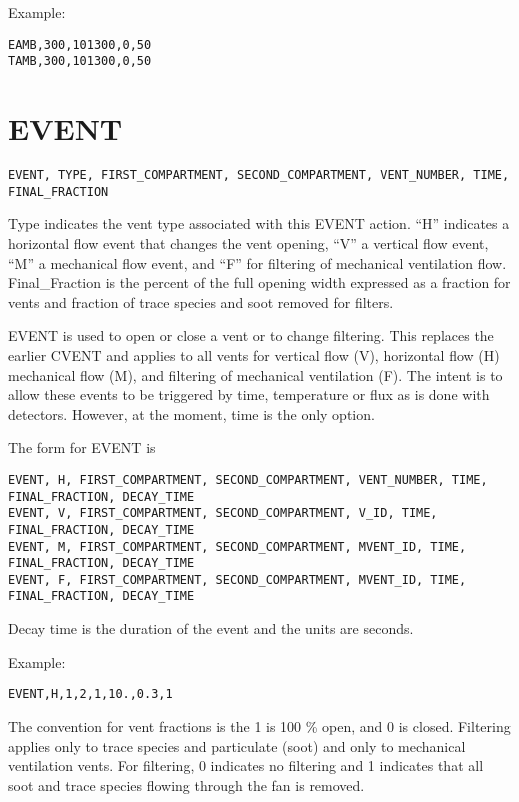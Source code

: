 Example:

\begin{lstlisting}
EAMB,300,101300,0,50
TAMB,300,101300,0,50
\end{lstlisting}

\section{EVENT}

\begin{lstlisting}
EVENT, TYPE, FIRST_COMPARTMENT, SECOND_COMPARTMENT, VENT_NUMBER, TIME, FINAL_FRACTION
\end{lstlisting}

Type indicates the vent type associated with this EVENT action. ``H'' indicates a horizontal flow event that changes the vent opening, ``V'' a vertical flow event, ``M'' a mechanical flow event, and ``F'' for filtering of mechanical ventilation flow.  Final\_Fraction is the percent of the full opening width expressed as a fraction for vents and fraction of trace species and soot removed for filters.

EVENT is used to open or close a vent or to change filtering. This replaces the earlier CVENT and applies to all vents for vertical flow (V), horizontal flow (H) mechanical flow (M), and filtering of mechanical ventilation (F). The intent is to allow these events to be triggered by time, temperature or flux as is done with detectors. However, at the moment, time is the only option.

The form for EVENT is

\begin{lstlisting}
EVENT, H, FIRST_COMPARTMENT, SECOND_COMPARTMENT, VENT_NUMBER, TIME, FINAL_FRACTION, DECAY_TIME
EVENT, V, FIRST_COMPARTMENT, SECOND_COMPARTMENT, V_ID, TIME, FINAL_FRACTION, DECAY_TIME
EVENT, M, FIRST_COMPARTMENT, SECOND_COMPARTMENT, MVENT_ID, TIME, FINAL_FRACTION, DECAY_TIME
EVENT, F, FIRST_COMPARTMENT, SECOND_COMPARTMENT, MVENT_ID, TIME, FINAL_FRACTION, DECAY_TIME
\end{lstlisting}

Decay time is the duration of the event and the units are seconds.

Example:

\begin{lstlisting}
EVENT,H,1,2,1,10.,0.3,1
\end{lstlisting}

The convention for vent fractions is the 1 is 100 \% open, and 0 is closed. Filtering applies only to trace species and particulate (soot) and only to mechanical ventilation vents. For filtering, 0 indicates no filtering and 1 indicates that all soot and trace species flowing through the fan is removed.

